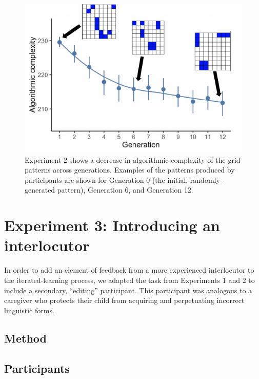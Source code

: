 \documentclass[10pt, letterpaper]{article}
\newenvironment{CodeChunk}{}{}
\begin{document}
\begin{CodeChunk}
\begin{figure}[tb]

{\centering \includegraphics{figs/e2_withplots-1} 

}

\caption[Experiment 2 shows a decrease in algorithmic complexity of the grid patterns across generations]{Experiment 2 shows a decrease in algorithmic complexity of the grid patterns across generations. Examples of the patterns produced by participants are shown for Generation 0 (the initial, randomly-generated pattern), Generation 6, and Generation 12.}\label{fig:e2_withplots}
\end{figure}
\end{CodeChunk}

\section{Experiment 3: Introducing an
interlocutor}\label{experiment-3-introducing-an-interlocutor}

In order to add an element of feedback from a more experienced
interlocutor to the iterated-learning process, we adapted the task from
Experiments 1 and 2 to include a secondary, ``editing'' participant.
This participant was analogous to a caregiver who protects their child
from acquiring and perpetuating incorrect linguistic forms.

\subsection{Method}\label{method-2}

\subsection{Participants}\label{participants-2}
\end{document}
